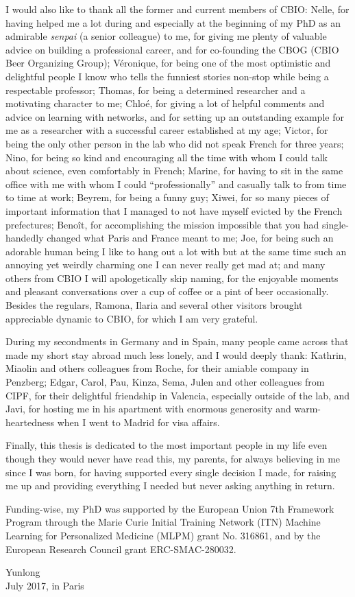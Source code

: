 I would also like to thank all the former and current members of CBIO: Nelle, for having helped me a lot during and especially at the beginning of my PhD as an admirable \textit{senpai} (a senior colleague) to me, for giving me plenty of valuable advice on building a professional career, and for co-founding the CBOG (CBIO Beer Organizing Group); V\'{e}ronique, for being one of the most optimistic and delightful people I know who tells the funniest stories non-stop while being a respectable professor; Thomas, for being a determined researcher and a motivating character to me; Chlo\'{e}, for giving a lot of helpful comments and advice on learning with networks, and for setting up an outstanding example for me as a researcher with a successful career established at my age; Victor, for being the only other person in the lab who did not speak French for three years; Nino, for being so kind and encouraging all the time with whom I could talk about science, even comfortably in French; Marine, for having to sit in the same office with me with whom I could ``professionally'' and casually talk to from time to time at work; Beyrem, for being a funny guy; Xiwei, for so many pieces of important information that I managed to not have myself evicted by the French prefectures; Beno\^{i}t, for accomplishing the mission impossible that you had single-handedly changed what Paris and France meant to me; Joe, for being such an adorable human being I like to hang out a lot with but at the same time such an annoying yet weirdly charming one I can never really get mad at; and many others from CBIO I will apologetically skip naming, for the enjoyable moments and pleasant conversations over a cup of coffee or a pint of beer occasionally. Besides the regulars, Ramona, Ilaria and several other visitors brought appreciable dynamic to CBIO, for which I am very grateful.


During my secondments in Germany and in Spain, many people came across that made my short stay abroad much less lonely, and I would deeply thank: Kathrin, Miaolin and others colleagues from Roche, for their amiable company in Penzberg; Edgar, Carol, Pau, Kinza, Sema, Julen and other colleagues from CIPF, for their delightful friendship in Valencia, especially outside of the lab, and Javi, for hosting me in his apartment with enormous generosity and warm-heartedness when I went to Madrid for visa affairs.


Finally, this thesis is dedicated to the most important people in my life even though they would never have read this, my parents, for always believing in me since I was born, for having supported every single decision I made, for raising me up and providing everything I needed but never asking anything in return.


Funding-wise, my PhD was supported by the European Union 7th Framework Program through the Marie Curie Initial Training Network (ITN) Machine Learning for Personalized Medicine (MLPM) grant No. 316861, and by the European Research Council grant ERC-SMAC-280032.


\begin{flushright}
Yunlong
\\
July 2017, in Paris
\end{flushright}
